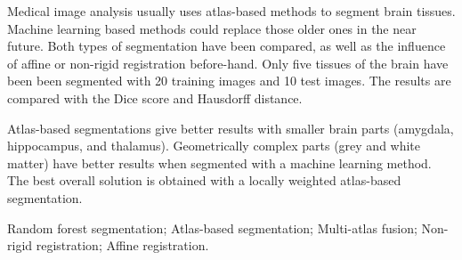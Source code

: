 Medical image analysis usually uses atlas-based methods to segment brain tissues. Machine learning based methods could replace those older ones in the near future. Both types of segmentation have been compared, as well as the influence of affine or non-rigid registration before-hand. Only five tissues of the brain have been been segmented with 20 training images and 10 test images. The results are compared with the Dice score and Hausdorff distance.

Atlas-based segmentations give better results with smaller brain parts (amygdala, hippocampus, and thalamus). Geometrically complex parts (grey and white matter) have better results when segmented with a machine learning method. The best overall solution is obtained with a locally weighted atlas-based segmentation.

\begin{IEEEkeywords}
Random forest segmentation; Atlas-based segmentation; Multi-atlas fusion; Non-rigid registration; Affine registration.
\end{IEEEkeywords}